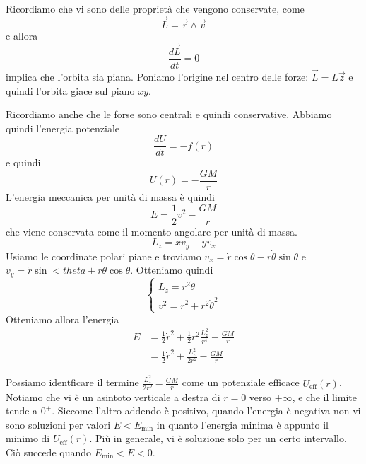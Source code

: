\documentclass[a4paper]{article}
\begin{document}
Ricordiamo che vi sono delle proprietà che vengono conservate, come
\[
    \vec{L} = \vec{r} \wedge \vec{v}
\]
e allora
\[
    \frac{d\vec{L}}{dt} = 0
\]
implica che l'orbita sia piana.
Poniamo l'origine nel centro delle forze: \(\vec{L} = L\vec{z}\)
e quindi l'orbita giace sul piano \(xy\).

Ricordiamo anche che le forse sono centrali e quindi conservative.
Abbiamo quindi l'energia potenziale
\[
    \frac{dU}{dt} = -f(r)
\]
e quindi
\[
    U(r) = - \frac{GM}{r}
\]
L'energia meccanica per unità di massa è quindi
\[
    E = \frac{1}{2} v^2 - \frac{GM}{r}
\]
che viene conservata come il momento angolare per unità di massa.
\[
    L_z = x v_y - y v_x
\]
Usiamo le coordinate polari piane
e troviamo \(v_x = \dot{r}\cos\theta - r\dot{\theta}\sin\theta\)
e \(v_y = \dot{r}\sin<theta + r\dot{\theta}\cos\theta\).
Otteniamo quindi
\[
    \begin{cases}
        L_z = r^2 \dot{\theta} \\
        v^2 = \dot{r}^2 + r^2 \dot{\theta}^2
    \end{cases}
\]
Otteniamo allora l'energia
\begin{align*}
    E &= \frac{1}{2} \dot{r}^2 + \frac{1}{2}r^2 \frac{L_z^2}{r^4} - \frac{GM}{r} \\
      &= \frac{1}{2} \dot{r}^2 + \frac{L_z^2}{2r^2} - \frac{GM}{r}
\end{align*}

Possiamo identficare il termine \(\frac{L_z^2}{2r^2} - \frac{GM}{r}\)
come un potenziale efficace \(U_\text{eff}(r)\).
Notiamo che vi è un asintoto verticale a destra di \(r=0\) verso \(+\infty\),
e che il limite tende a \(0^+\).
Siccome l'altro addendo è positivo, quando l'energia è negativa
non vi sono soluzioni per valori \(E < E_\text{min}\)
in quanto l'energia minima è appunto il minimo di \(U_\text{eff}(r)\).
Più in generale, vi è soluzione solo per un certo
intervallo. Ciò succede quando \(E_\text{min} < E < 0\). %
\end{document}
